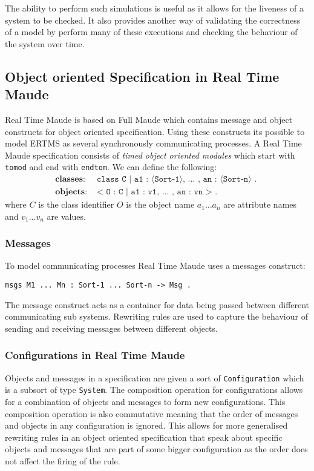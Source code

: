 The ability to perform such simulations is useful as it allows for the liveness of a system to be checked. It also provides another way of validating the correctness of a model by perform many of these executions and checking the behaviour of the system over time.

\subsection{Object oriented Specification in Real Time Maude}
Real Time Maude is based on Full Maude which contains message and object constructs for object oriented specification. Using these constructs its possible to model ERTMS as several synchronously communicating processes. A Real Time Maude specification consists of  \emph{timed object oriented modules} which start with \texttt{tomod} and end with \texttt{endtom}.
\medskip
We can define the following:
\begin{align*}
\textbf{classes}: & \texttt{ class C | a1 : ⟨Sort-1⟩, ... , an : ⟨Sort-n⟩ . } \\
\textbf{objects}: & \texttt{ < O : C | a1 : v1, ... , an : vn >  . } 
\end{align*}
where $C$ is the class identifier $O$ is the object name  $a_1 \ldots a_n$ are attribute names and $v_1 \ldots v_n$ are values. \\
\medskip
\subsubsection*{Messages}
To model communicating processes Real Time Maude uses a messages construct:
\begin{center}
\verb|msgs M1 ... Mn : Sort-1 ... Sort-n -> Msg . | 
\end{center}

The message construct acts as a container for data being passed between different communicating sub systems. Rewriting rules are used to capture the behaviour of sending and receiving messages between different objects.

\subsubsection*{Configurations in Real Time Maude}
Objects and messages in a specification are given a sort of \texttt{Configuration} which is a subsort of type \texttt{System}. The composition operation for configurations allows for a combination of objects and messages to form new configurations. This composition operation is also commutative meaning that the order of messages and objects in any configuration is ignored. This allows for more generalised rewriting rules in an object oriented specification that speak about specific objects and messages that are part of some bigger configuration as the order does not affect the firing of the rule.

